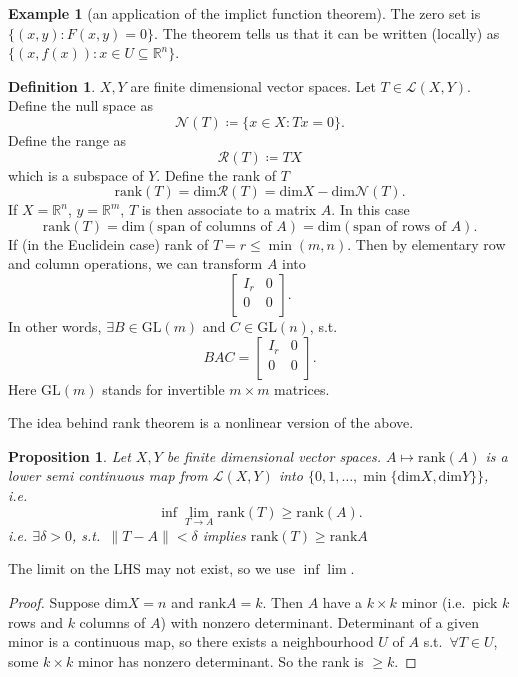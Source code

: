 \documentclass[12pt]{article}
\theoremstyle{plain}
\newtheorem*{prop}{Proposition}
\theoremstyle{definition}
\newtheorem*{defn}{Definition}
\newtheorem*{eg}{Example}
\begin{document}
\begin{eg}[an application of the implict function theorem]
    The zero set is $\{(x,y):F(x,y) = 0\}$.
    The theorem tells us that it can be written (locally) as $\{(x,f(x)):x\in U\subseteq \mathbb{R}^n\}$.
\end{eg}

\begin{defn}
    $X, Y$ are finite dimensional vector spaces.
    Let $T\in\mathcal{L}(X,Y)$.
    Define the null space as
    \[
        \mathcal{N}(T)\coloneqq\{x\in X:Tx=0\}.
    \]
    Define the range as
    \[
        \mathcal{R}(T)\coloneqq TX
    \]
    which is a subspace of $Y$.
    Define the rank of $T$
    \[
        \text{rank}(T) = \text{dim} \mathcal{R}(T) = \text{dim} X - \text{dim}\mathcal{N}(T).
    \]
    If $X=\mathbb{R}^n$, $y=\mathbb{R}^m$, $T$ is then associate to a matrix $A$.
    In this case
    \[
        \text{rank}(T) = \text{dim}(\text{span of columns of }A) = \text{dim}(\text{span of rows of }A).
    \]
    If (in the Euclidein case) rank of $T = r\leq \min(m,n)$.
    Then by elementary row and column operations, we can transform $A$ into
    \[
        \begin{bmatrix}
            I_r & 0\\
            0 & 0\\
        \end{bmatrix}.
    \]
    In other words, $\exists B\in \mathrm{GL}(m)$ and $C\in \mathrm{GL}(n)$, s.t.
    \[
        B A C=
        \begin{bmatrix}
            I_r & 0\\
            0   & 0\\
        \end{bmatrix}.
    \]
    Here $\mathrm{GL}(m)$ stands for invertible $m\times m$ matrices.
\end{defn}
The idea behind rank theorem is a nonlinear version of the above.

\begin{prop}
    Let $X,Y$ be finite dimensional vector spaces.
    $A\mapsto \text{rank}(A)$ is a lower semi continuous map from $\mathcal{L}(X,Y)$ into $\{0,1,\ldots,\min\{\text{dim}X,\text{dim}Y\}\}$,
    i.e.
    \[
        \inf \lim_{T\rightarrow A} \text{rank}(T)\geq \text{rank}(A).
    \]
    i.e. $\exists \delta > 0$, s.t.\ $\|T-A\|<\delta$ implies $\text{rank}(T)\geq \text{rank}A$
\end{prop}
    The limit on the LHS may not exist, so we use $\inf\lim$.
\begin{proof}
    Suppose $\text{dim}X=n$ and $\text{rank}A=k$.
    Then $A$ have a $k\times k$ minor (i.e.\ pick $k$ rows and $k$ columns of $A$) with nonzero determinant.
    Determinant of a given minor is a continuous map, so there exists a neighbourhood $U$ of $A$ s.t.\ $\forall T\in U$, some $k\times k$ minor has
    nonzero determinant.
    So the rank is $\geq k$.
\end{proof}
\end{document}
